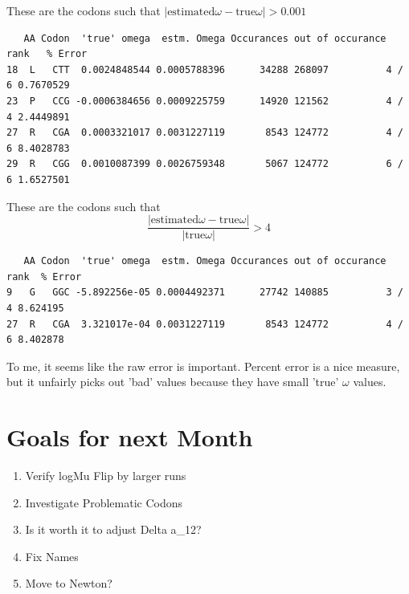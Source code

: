 These are the codons such that $|\mbox{estimated}\omega - \mbox{true}\omega| > 0.001$

\begin{verbatim}
   AA Codon  'true' omega  estm. Omega Occurances out of occurance rank   % Error
18  L   CTT  0.0024848544 0.0005788396      34288 268097          4 / 6 0.7670529
23  P   CCG -0.0006384656 0.0009225759      14920 121562          4 / 4 2.4449891
27  R   CGA  0.0003321017 0.0031227119       8543 124772          4 / 6 8.4028783
29  R   CGG  0.0010087399 0.0026759348       5067 124772          6 / 6 1.6527501
\end{verbatim}

These are the codons such that $$\frac{|\mbox{estimated}\omega - \mbox{true}\omega|}{|\mbox{true}\omega|} > 4$$

\begin{verbatim}
   AA Codon  'true' omega  estm. Omega Occurances out of occurance rank  % Error
9   G   GGC -5.892256e-05 0.0004492371      27742 140885          3 / 4 8.624195
27  R   CGA  3.321017e-04 0.0031227119       8543 124772          4 / 6 8.402878
\end{verbatim}





To me, it seems like the raw error is important. Percent error is a nice measure, but it unfairly picks out 'bad' values because they have small 'true' $\omega$ values.

\section{Goals for next Month}
\begin{enumerate}
\item Verify logMu Flip by larger runs
\item Investigate Problematic Codons
\item Is it worth it to adjust Delta a\_12?
\item Fix Names
\item Move to Newton?
\end{enumerate}



